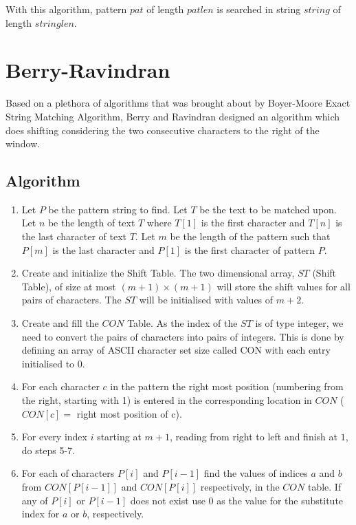 With this algorithm, pattern $pat$ of length $patlen$ is searched in string $string$ of length $stringlen$.


\section{Berry-Ravindran}
Based on a plethora of algorithms that was brought about by Boyer-Moore Exact String Matching Algorithm, Berry and Ravindran designed an algorithm which does shifting considering the two consecutive characters to the right of the window.
\subsection{Algorithm}
\begin{enumerate}
\item Let $P$ be the pattern string to find. Let $T$ be the text to be matched upon. Let $n$ be the length of text $T$ where $T[1]$ is the first character and $T[n]$ is the last character of text $T$. Let $m$ be the length of the pattern such that $P[m]$ is the last character and $P[1]$ is the first character of pattern $P$.

\item Create and initialize the Shift Table. The two dimensional array, $ST$ (Shift Table), of size at most $(m+1)\times(m+1)$ will store the shift values for all pairs of characters. The $ST$ will be initialised with values of $m+2$.

\item Create and fill the $CON$ Table. As the index of the $ST$ is of type integer, we need to convert the pairs of characters into pairs of integers. This is done by defining an array of ASCII character set size called CON with each entry initialised to $0$.

\item For each character $c$ in the pattern the right most position (numbering from the right, starting with 1) is entered in the corresponding location in $CON$ ($CON[c]=$ right most position of c).

\item For every index $i$ starting at $m+1$, reading from right to left and finish at $1$, do steps 5-7.

	\item For each of characters $P[i]$ and $P[i-1]$ find the values of indices $a$ and $b$ from $CON[P[i-1]]$ and $CON[P[i]]$ respectively, in the $CON$ table.  If any of $P[i]$ or $P[i-1]$ does not exist use $0$ as the value for the substitute index for $a$ or $b$, respectively.


\end{enumerate}
